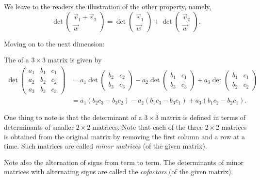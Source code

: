 \documentclass{ximera}
\begin{document}
We leave to the readers the illustration of the other property, namely,
\[
  \det
  \begin{pmatrix}
    \vec{v}_1 + \vec{v}_2 \\ \vec{w}
  \end{pmatrix}
  = \det
  \begin{pmatrix}
    \vec{v}_1 \\ \vec{w}
  \end{pmatrix}
  + \det
  \begin{pmatrix}
    \vec{v}_2 \\ \vec{w}
  \end{pmatrix}.
\]


Moving on to the next dimension:
\begin{definition}
  The  of a $3 \times 3$ matrix is given by
  \begin{align*}
    \det\begin{pmatrix}
      a_1 &  b_1 & c_1 \\
      a_2 &  b_2 & c_2 \\
      a_3 &  b_3 & c_3
    \end{pmatrix}
    & =
      a_1 \det
      \begin{pmatrix}
        b_2 & c_2 \\
        b_3 & c_3
      \end{pmatrix}
      - a_2 \det
      \begin{pmatrix}
        b_1 & c_1 \\
        b_3 & c_3
      \end{pmatrix}
      + a_3 \det
      \begin{pmatrix}
        b_1 & c_1 \\
        b_2 & c_2
      \end{pmatrix} \\
          & = a_1(b_2c_3 - b_3c_2) - a_2(b_1c_3 - b_3c_1) + a_3(b_1c_2 - b_2c_1).
  \end{align*}
\end{definition}


One thing to note is that the determinant of a $3 \times 3$ matrix is
defined in terms of determinants of smaller $2 \times 2$ matrices. Note
that each of the three $2 \times 2$ matrices is obtained from the original
matrix by removing the first column and a row at a time. Such matrices
are called \textit{minor matrices} (of the given matrix).

Note also the alternation of signs from term to term. The determinants
of minor matrices with alternating signs are called the \textit{cofactors} (of
the given matrix).
\end{document}
